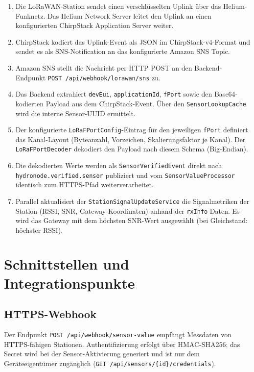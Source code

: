 \begin{enumerate}
  \item Die LoRaWAN-Station sendet einen verschlüsselten Uplink über das Helium-Funknetz.
        Das Helium Network Server leitet den Uplink an einen konfigurierten ChirpStack
        Application Server weiter.
  \item ChirpStack kodiert das Uplink-Event als JSON im ChirpStack-v4-Format und
        sendet es als SNS-Notification an das konfigurierte Amazon SNS Topic.
  \item Amazon SNS stellt die Nachricht per HTTP POST an den Backend-Endpunkt
        \texttt{POST /api/webhook/lorawan/sns} zu.
  \item Das Backend extrahiert \texttt{devEui}, \texttt{applicationId}, \texttt{fPort} sowie
        den Base64-kodierten Payload aus dem ChirpStack-Event.
        Über den \texttt{SensorLookupCache} wird die interne Sensor-UUID ermittelt.
  \item Der konfigurierte \texttt{LoRaFPortConfig}-Eintrag für den jeweiligen \texttt{fPort}
        definiert das Kanal-Layout (Byteanzahl, Vorzeichen, Skalierungsfaktor je Kanal).
        Der \texttt{LoRaFPortDecoder} dekodiert den Payload nach diesem Schema (Big-Endian).
  \item Die dekodierten Werte werden als \texttt{SensorVerifiedEvent} direkt nach
        \texttt{hydronode.verified.sensor} publiziert und vom \texttt{SensorValueProcessor}
        identisch zum HTTPS-Pfad weiterverarbeitet.
  \item Parallel aktualisiert der \texttt{StationSignalUpdateService} die Signalmetriken
        der Station (RSSI, SNR, Gateway-Koordinaten) anhand der \texttt{rxInfo}-Daten.
        Es wird das Gateway mit dem höchsten SNR-Wert ausgewählt (bei Gleichstand: höchster RSSI).
\end{enumerate}


\section*{Schnittstellen und Integrationspunkte}

\subsection*{HTTPS-Webhook}

Der Endpunkt \texttt{POST /api/webhook/sensor-value} empfängt Messdaten von HTTPS-fähigen
Stationen. Authentifizierung erfolgt über HMAC-SHA256; das Secret wird bei der Sensor-Aktivierung
generiert und ist nur dem Geräteeigentümer zugänglich (\texttt{GET /api/sensors/\{id\}/credentials}).

